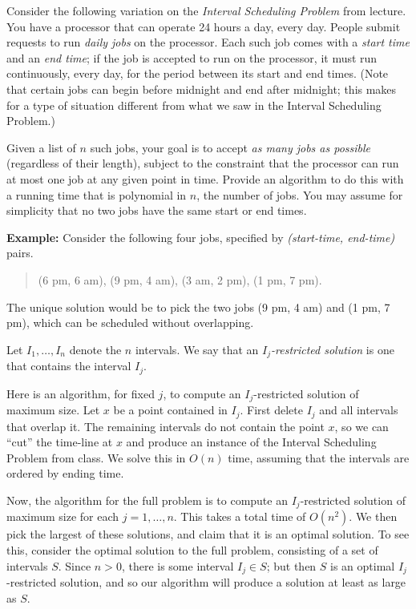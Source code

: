 \documentclass[12pt]{article}
\begin{document}
Consider the following variation on
the {\em Interval Scheduling Problem} from lecture.
You have a processor that can operate 24 hours a day, every day.
People submit requests to run {\em daily jobs} on the processor.
Each such job comes with a
{\em start time} and an {\em end time};
if the job is accepted to run on the processor, it must
run continuously, every day, for the period between
its start and end times.
(Note that certain jobs can begin before midnight and end
after midnight; this makes for a type of situation different
from what we saw in the Interval Scheduling Problem.)

Given a list of $n$ such jobs, your goal is to accept
{\em as many jobs as possible} (regardless of their length),
subject to the constraint that the processor can run
at most one job at any given point in time.
Provide an algorithm to do this with a running time
that is polynomial in $n$, the number of jobs.
You may assume for simplicity that no two jobs have the
same start or end times.

{\bf Example:} Consider the following four jobs, specified
by {\em (start-time, end-time)} pairs.
\begin{quote}
(6 pm, 6 am), (9 pm, 4 am), (3 am, 2 pm), (1 pm, 7 pm).
\end{quote}
The unique solution would be to pick the two jobs
(9 pm, 4 am) and (1 pm, 7 pm), which can be scheduled
without overlapping.
\par 
Let $I_1, \ldots, I_n$ denote the $n$ intervals.
We say that an {\em $I_j$-restricted solution} 
is one that contains the interval $I_j$.

Here is an algorithm, for fixed $j$, to compute
an $I_j$-restricted solution of maximum size.
Let $x$ be a point contained in $I_j$.
First delete $I_j$ and all intervals that overlap it.
The remaining intervals do not contain the point $x$,
so we can ``cut'' the time-line at $x$ and produce
an instance of the Interval Scheduling Problem from class.
We solve this in $O(n)$ time, assuming that the intervals
are ordered by ending time.

Now, the algorithm for the full problem is to
compute an $I_j$-restricted solution of maximum size
for each $j = 1, \ldots, n$.
This takes a total time of $O(n^2)$.
We then pick the largest of these solutions, and
claim that it is an optimal solution.
To see this, consider the optimal solution to 
the full problem, consisting of a set of intervals $S$.
Since $n > 0$, there is some interval $I_j \in S$;
but then $S$ is an optimal $I_j$-restricted solution,
and so our algorithm will produce a solution at 
least as large as $S$.
\end{document}
